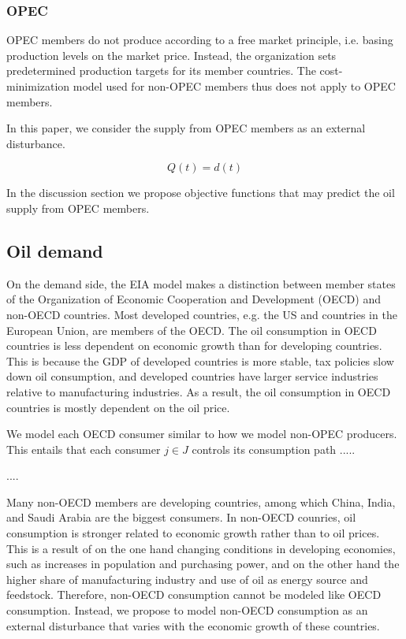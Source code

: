 \subsubsection{OPEC}
OPEC members do not produce according to a free market principle, i.e. basing production levels on the market price.
Instead, the organization sets predetermined production targets for its member countries.
The cost-minimization model used for non-OPEC members thus does not apply to OPEC members.

In this paper, we consider the supply from OPEC members as an external disturbance.

\begin{equation}
    Q(t) = d(t)
\end{equation}

In the discussion section we propose objective functions that may predict the oil supply from OPEC members.


\subsection{Oil demand}
On the demand side, the EIA model makes a distinction between member states of the Organization of Economic Cooperation and Development (OECD) and non-OECD countries.
Most developed countries, e.g. the US and countries in the European Union, are members of the OECD.
The oil consumption in OECD countries is less dependent on economic growth than for developing countries.
This is because the GDP of developed countries is more stable, tax policies slow down oil consumption, and developed countries have larger service industries relative to manufacturing industries.
As a result, the oil consumption in OECD countries is mostly dependent on the oil price.

We model each OECD consumer similar to how we model non-OPEC producers.
This entails that each consumer $j\in J$ controls its consumption path .....


....


Many non-OECD members are developing countries, among which China, India, and Saudi Arabia are the biggest consumers.
In non-OECD counries, oil consumption is stronger related to economic growth rather than to oil prices.
This is a result of on the one hand changing conditions in developing economies, such as increases in population and purchasing power, and on the other hand the higher share of manufacturing industry and use of oil as energy source and feedstock.   
Therefore, non-OECD consumption cannot be modeled like OECD consumption.
Instead, we propose to model non-OECD consumption as an external disturbance that varies with the economic growth of these countries.

